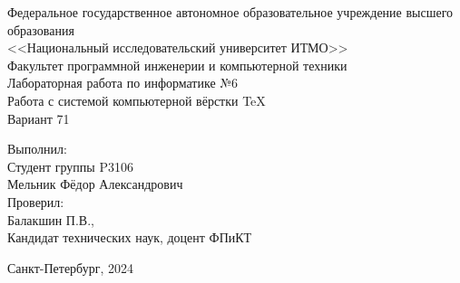 
\begin{center}
\vspace{-\baselineskip}
\small Федеральное государственное автономное образовательное учреждение высшего образования\\
<<Национальный исследовательский университет ИТМО>>\\
\vspace{1cm}
Факультет программной инженерии и компьютерной техники\\
\vspace{10cm}
Лабораторная работа по информатике №6\\
\vspace{0.2cm}
Работа с системой компьютерной вёрстки \TeX\\
\vspace{0.2cm}
Вариант 71\\
\vspace{8cm}
\end{center}
\begin{flushright}
\vspace{-\baselineskip}
Выполнил:\\
Студент группы P3106\\
Мельник Фёдор Александрович\\
Проверил:\\
Балакшин П.В.,\\
Кандидат технических наук, доцент ФПиКТ\\
\end{flushright}
\begin{center}
\vspace{-\baselineskip}
\vspace{0.75cm}
Санкт-Петербург, 2024
\end{center}